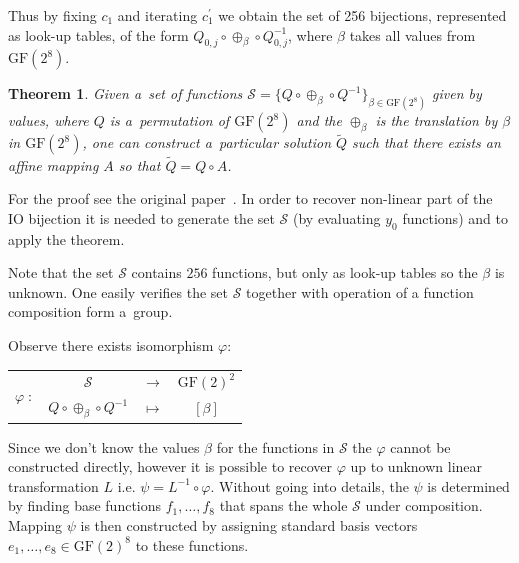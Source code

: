 \documentclass[11pt,oneside,final]{fithesis2}
\newtheorem{mytheorem}{Theorem}
\newcommand{\gfe}{\ensuremath{\text{GF}\left(2^8\right)}}
\newcommand{\gf}{\ensuremath{\text{GF}\left(2\right)}}
\begin{document}
    Thus by fixing $c_1$ and iterating $c^{\prime}_1$ we obtain the set of 256 bijections, represented as look-up tables, 
    of the form $Q_{0,j} \circ \oplus_{\beta} \circ Q^{-1}_{0,j}$, where $\beta$ takes all values from $\gfe$.
    
    \begin{mytheorem}\label{prop:bge1}
     Given a~set of functions $\mathcal{S} = \{Q \circ \oplus_{\beta} \circ Q^{-1}\}_{\beta \in \gfe}$ given by values, 
     where $Q$ is a~permutation of $\gfe$ and the $\oplus_{\beta}$ is the translation by $\beta$ in $\gfe$, one can construct a~particular
     solution $\widetilde{Q}$ such that there exists an affine mapping $A$ so that $\widetilde{Q} = Q \circ A$.
    \end{mytheorem}
    
    For the proof see the original paper~\citep{Billet:2004:CWB:2080787.2080809}. In order to recover non-linear part of the IO bijection it is needed to generate
    the set $\mathcal{S}$ (by evaluating $y_0$ functions) and to apply the theorem.
    
    Note that the set $\mathcal{S}$ contains $256$ functions, but only as look-up tables so the $\beta$ is unknown. One easily verifies the set
    $\mathcal{S}$ together with operation of a function composition form a~group. 
    
    Observe there exists isomorphism $\varphi:\; $
    
    \begin{center}
    \begin{tabular}{ r  c c c }
	\multirow{2}{*}{$\varphi \; :$} & $\mathcal{S}$  & $\longrightarrow$ & $\gf^2$ \\
	                                & $Q \circ \oplus_{\beta} \circ Q^{-1} $ & $\longmapsto$ & $\left[ \beta \right]$
	
    \end{tabular}
    \end{center}
    
    Since we don't know the values $\beta$ for the functions in $\mathcal{S}$ the $\varphi$ cannot be constructed directly, however it is possible to 
    recover $\varphi$ up to unknown linear transformation $L$ i.e. $\psi = L^{-1} \circ \varphi$. Without going into details, the 
    $\psi$ is determined by finding base functions $f_1,\dots,f_8$ that spans the whole $\mathcal{S}$ under composition. Mapping $\psi$ is then constructed by assigning
    standard basis vectors $e_1,\dots,e_8 \in \gf^8$ to these functions.
    
\end{document}
